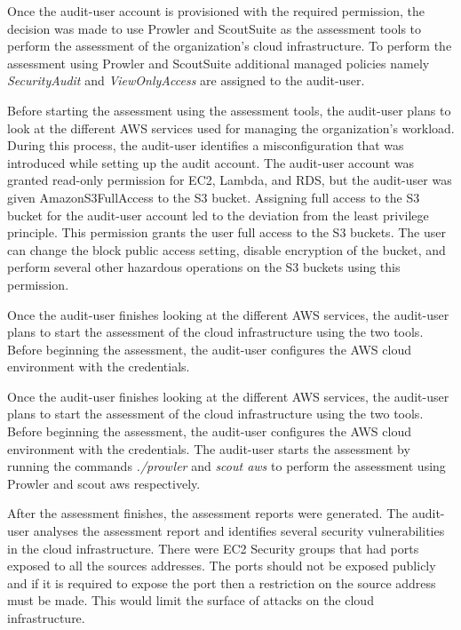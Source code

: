 \par Once the audit-user account is provisioned with the required permission, the decision was made to use Prowler and ScoutSuite as the assessment tools to perform the assessment of the organization’s cloud infrastructure.
To perform the assessment using Prowler and ScoutSuite additional managed policies namely \textit{SecurityAudit} and \textit{ViewOnlyAccess} are assigned to the audit-user.

\par Before starting the assessment using the assessment tools, the audit-user plans to look at the different AWS services used for managing the organization’s workload.
During this process, the audit-user identifies a misconfiguration that was introduced while setting up the audit account.
The audit-user account was granted read-only permission for EC2, Lambda, and RDS, but the audit-user was given AmazonS3FullAccess to the S3 bucket.
Assigning full access to the S3 bucket for the audit-user account led to the deviation from the least privilege principle.
This permission grants the user full access to the S3 buckets.
The user can change the block public access setting, disable encryption of the bucket, and perform several other hazardous operations on the S3 buckets using this permission.

\par Once the audit-user finishes looking at the different AWS services, the audit-user plans to start the assessment of the cloud infrastructure using the two tools.
Before beginning the assessment, the audit-user configures the AWS cloud environment with the credentials.

\par Once the audit-user finishes looking at the different AWS services, the audit-user plans to start the assessment of the cloud infrastructure using the two tools.
Before beginning the assessment, the audit-user configures the AWS cloud environment with the credentials.
The audit-user starts the assessment by running the commands \textit{./prowler} and \textit{scout aws} to perform the assessment using Prowler and scout aws respectively.

\par After the assessment finishes, the assessment reports were generated.
The audit-user analyses the assessment report and identifies several security vulnerabilities in the cloud infrastructure.
There were EC2 Security groups that had ports exposed to all the sources addresses.
The ports should not be exposed publicly and if it is required to expose the port then a restriction on the source address must be made.
This would limit the surface of attacks on the cloud infrastructure.


